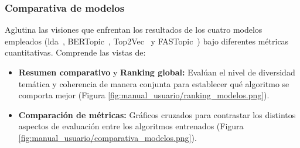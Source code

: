 \subsubsection{Comparativa de modelos}
Aglutina las visiones que enfrentan los resultados de los cuatro modelos
empleados (\acrshort{lda}~\cite{blei2003lda},
BERTopic~\cite{QuickStartBERTopic},
Top2Vec~\cite{angelovTop2VecDistributedRepresentations2020} y
FASTopic~\cite{FastopicFASTopic}) bajo diferentes métricas cuantitativas.
Comprende las vistas de:
\begin{itemize}
    \item \textbf{Resumen comparativo} y \textbf{Ranking global:} Evalúan el nivel de diversidad temática y coherencia de manera conjunta para establecer qué algoritmo se comporta mejor (Figura \ref{fig:manual_usuario/ranking_modelos.png}).
    \item \textbf{Comparación de métricas:} Gráficos cruzados para contrastar los distintos aspectos de evaluación entre los algoritmos entrenados (Figura \ref{fig:manual_usuario/comparativa_modelos.png}).
\end{itemize}

